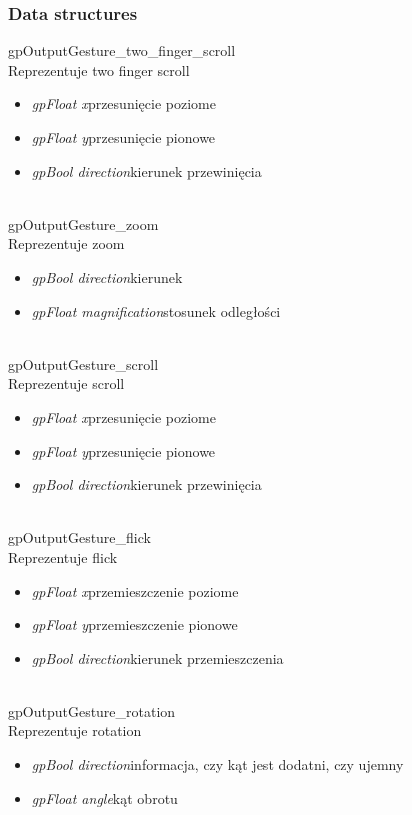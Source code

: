 \subsubsection{Data structures}
\textsf{gpOutputGesture_two_finger_scroll} \\ \indent Reprezentuje two finger scroll
	\begin{itemize}
		\item \textit{gpFloat x}\quad przesunięcie poziome
		\item \textit{gpFloat y}\quad przesunięcie pionowe
		\item \textit{gpBool direction}\quad kierunek przewinięcia
	\end{itemize}
\ \\
\textsf{gpOutputGesture_zoom} \\ \indent Reprezentuje zoom
	\begin{itemize}
		\item \textit{gpBool direction}\quad kierunek
		\item \textit{gpFloat magnification}\quad stosunek odległości
	\end{itemize}
\ \\
\textsf{gpOutputGesture_scroll} \\ \indent Reprezentuje scroll
	\begin{itemize}
		\item \textit{gpFloat x}\quad przesunięcie poziome
		\item \textit{gpFloat y}\quad przesunięcie pionowe
		\item \textit{gpBool direction}\quad kierunek przewinięcia
	\end{itemize}
\ \\
\textsf{gpOutputGesture_flick} \\ \indent Reprezentuje flick
	\begin{itemize}
		\item \textit{gpFloat x}\quad przemieszczenie poziome
		\item \textit{gpFloat y}\quad przemieszczenie pionowe
		\item \textit{gpBool direction}\quad kierunek przemieszczenia
	\end{itemize}
\ \\
\textsf{gpOutputGesture_rotation} \\ \indent Reprezentuje rotation
	\begin{itemize}
		\item \textit{gpBool direction}\quad informacja, czy kąt jest dodatni, czy ujemny
		\item \textit{gpFloat angle}\quad kąt obrotu
	\end{itemize}
